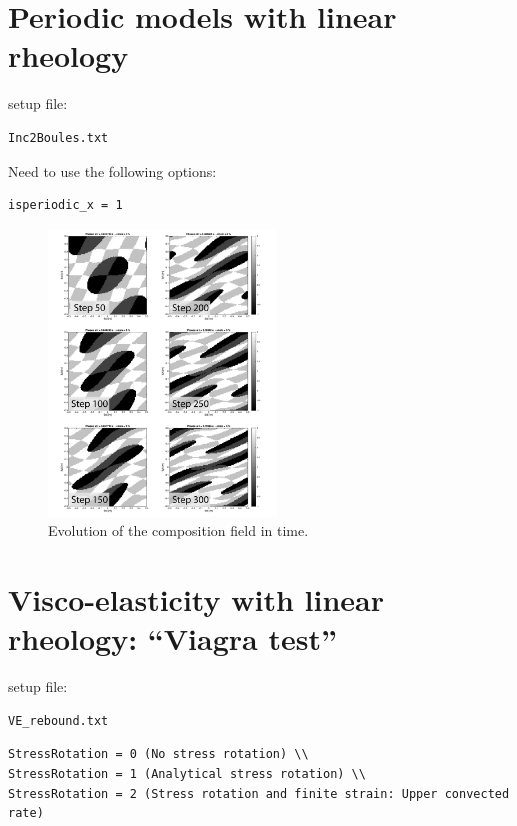 \documentclass[12pt,english,openany]{scrbook}
\begin{document}
\section{Periodic models with linear rheology}

setup file:
\begin{verbatim} 
Inc2Boules.txt
\end{verbatim}

Need to use the following options:
\begin{verbatim} 
isperiodic_x = 1
\end{verbatim}

\begin{figure}[ht!]
\centerline{\includegraphics[height=3.0in]{./Figures/Periodic_Inc2Boules_MDOODZ}}
\caption{Evolution of the composition field in time.}
\label{Inc2Bouless}
\end{figure}

\section{Visco-elasticity with linear rheology: ``Viagra test'' }

setup file:
\begin{verbatim} 
VE_rebound.txt
\end{verbatim}

\begin{verbatim} 
StressRotation = 0 (No stress rotation) \\
StressRotation = 1 (Analytical stress rotation) \\
StressRotation = 2 (Stress rotation and finite strain: Upper convected rate)
\end{verbatim}
\end{document}

